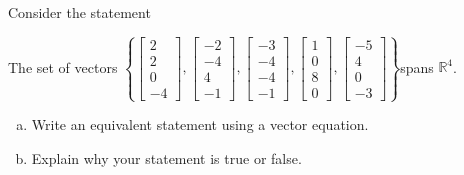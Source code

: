 
\begin{exerciseStatement}


Consider the statement 
\begin{center}\begin{minipage}{0.8\textwidth}
 The set of vectors \( \left\{ \left[\begin{array}{c}
2 \\
2 \\
0 \\
-4
\end{array}\right] , \left[\begin{array}{c}
-2 \\
-4 \\
4 \\
-1
\end{array}\right] , \left[\begin{array}{c}
-3 \\
-4 \\
-4 \\
-1
\end{array}\right] , \left[\begin{array}{c}
1 \\
0 \\
8 \\
0
\end{array}\right] , \left[\begin{array}{c}
-5 \\
4 \\
0 \\
-3
\end{array}\right] \right\} \)spans \(\mathbb{R}^4\). 
\end{minipage}\end{center}
    


\begin{enumerate}[(a)]
\item  Write an equivalent statement using a vector equation.
\item  Explain why your statement is true or false.
\end{enumerate}
    
\end{exerciseStatement}
    
